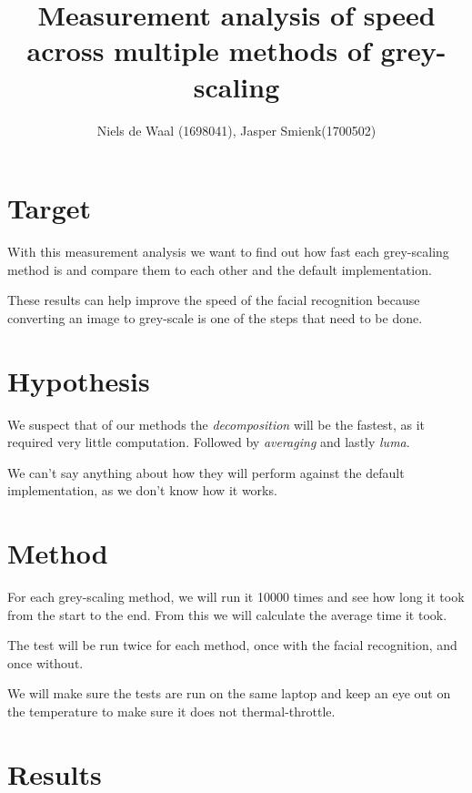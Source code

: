 \documentclass[a4paper]{article}
\begin{document}
\title{Measurement analysis of speed across multiple methods of grey-scaling}
\author{Niels de Waal (1698041), Jasper Smienk(1700502)}
\maketitle
\newpage

\tableofcontents
\newpage

\section{Target}
With this measurement analysis we want to find out how fast each grey-scaling method is and compare them to each other and the default implementation.

These results can help improve the speed of the facial recognition because converting an image to grey-scale is one of the steps that need to be done.

\section{Hypothesis}
We suspect that of our methods the \textit{decomposition} will be the fastest, as it required very little computation. Followed by \textit{averaging} and lastly \textit{luma}.

We can't say anything about how they will perform against the default implementation, as we don't know how it works.

\section{Method}
For each grey-scaling method, we will run it 10000 times and see how long it took from the start to the end. From this we will calculate the average time it took.

The test will be run twice for each method, once with the facial recognition, and once without.

We will make sure the tests are run on the same laptop and keep an eye out on the temperature to make sure it does not thermal-throttle.

\newpage
\section{Results}
\end{document}
